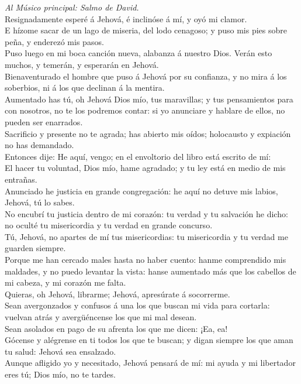  \emph{Al Músico principal: Salmo de David.}\\
Resignadamente esperé á Jehová, é inclinóse á mí, y oyó mi clamor.\\
 E hízome sacar de un lago de miseria, del lodo cenagoso; y
puso mis pies sobre peña, y enderezó mis pasos.\\
 Puso luego en mi boca canción nueva, alabanza á nuestro
Dios. Verán esto muchos, y temerán, y esperarán en Jehová.\\
 Bienaventurado el hombre que puso á Jehová por su
confianza, y no mira á los soberbios, ni á los que declinan á la
mentira.\\
 Aumentado has tú, oh Jehová Dios mío, tus maravillas; y tus
pensamientos para con nosotros, no te los podremos contar: si yo
anunciare y hablare de ellos, no pueden ser enarrados.\\
 Sacrificio y presente no te agrada; has abierto mis oídos;
holocausto y expiación no has demandado.\\
 Entonces dije: He aquí, vengo; en el envoltorio del libro
está escrito de mí:\\
 El hacer tu voluntad, Dios mío, hame agradado; y tu ley
está en medio de mis entrañas.\\
 Anunciado he justicia en grande congregación: he aquí no
detuve mis labios, Jehová, tú lo sabes.\\
 No encubrí tu justicia dentro de mi corazón: tu verdad y
tu salvación he dicho: no oculté tu misericordia y tu verdad en grande
concurso.\\
 Tú, Jehová, no apartes de mí tus misericordias: tu
misericordia y tu verdad me guarden siempre.\\
 Porque me han cercado males hasta no haber cuento: hanme
comprendido mis maldades, y no puedo levantar la vista: hanse aumentado
más que los cabellos de mi cabeza, y mi corazón me falta.\\
 Quieras, oh Jehová, librarme; Jehová, apresúrate á
socorrerme.\\
 Sean avergonzados y confusos á una los que buscan mi vida
para cortarla: vuelvan atrás y avergüéncense los que mi mal desean.\\
 Sean asolados en pago de su afrenta los que me dicen: ¡Ea,
ea!\\
 Gócense y alégrense en ti todos los que te buscan; y digan
siempre los que aman tu salud: Jehová sea ensalzado.\\
 Aunque afligido yo y necesitado, Jehová pensará de mí: mi
ayuda y mi libertador eres tú; Dios mío, no te tardes.

